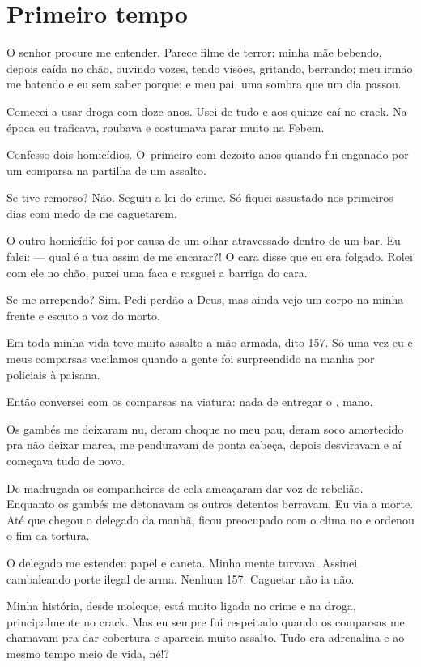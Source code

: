  

\section{Primeiro tempo}

O senhor procure me entender. Parece filme de terror: minha mãe bebendo,
depois caída no chão, ouvindo vozes, tendo visões, gritando, berrando;
meu irmão me batendo e eu sem saber porque; e meu pai, uma sombra que um
dia passou.

\asterisc{}

Comecei a usar droga com doze anos. Usei de tudo e aos quinze caí no
crack. Na época eu traficava, roubava e costumava parar muito na Febem.

Confesso dois homicídios. O~primeiro com dezoito anos quando fui
enganado por um comparsa na partilha de um assalto.

Se tive remorso? Não. Seguiu a lei do crime. Só fiquei assustado nos
primeiros dias com medo de me caguetarem.

O outro homicídio foi por causa de um olhar atravessado dentro de um
bar. Eu falei: --- qual é a tua assim de me encarar?! O cara disse que
eu era folgado. Rolei com ele no chão, puxei uma faca e rasguei a
barriga do cara.

Se me arrependo? Sim. Pedi perdão a Deus, mas ainda vejo um corpo na
minha frente e escuto a voz do morto.

Em toda minha vida teve muito assalto a mão armada, dito 157. Só uma vez
eu e meus comparsas vacilamos quando a gente foi surpreendido na manha
por policiais à paisana.

Então conversei com os comparsas na viatura: nada de entregar o ,
mano.

Os gambés me deixaram nu, deram choque no meu pau, deram soco amortecido
pra não deixar marca, me penduravam de ponta cabeça, depois desviravam e
aí começava tudo de novo.

De madrugada os companheiros de cela ameaçaram dar voz de rebelião.
Enquanto os gambés me detonavam os outros detentos berravam. Eu via a
morte. Até que chegou o delegado da manhã, ficou preocupado com o clima
no  e ordenou o fim da tortura.

O delegado me estendeu papel e caneta. Minha mente turvava. Assinei
cambaleando porte ilegal de arma. Nenhum 157. Caguetar não ia não.

Minha história, desde moleque, está muito ligada no crime e na droga,
principalmente no crack. Mas eu sempre fui respeitado quando os
comparsas me chamavam pra dar cobertura e aparecia muito assalto. Tudo
era adrenalina e ao mesmo tempo meio de vida, né!?

